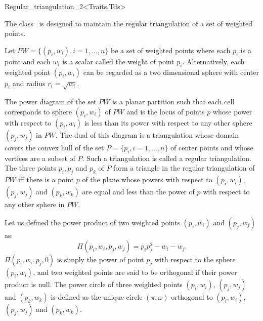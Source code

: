 

\begin{ccRefClass}{Regular_triangulation_2<Traits,Tds>}  %


\ccDefinition
  
The class \ccRefName\ 
is designed to maintain the
regular triangulation of a set of weighted points.


Let ${  PW} = \{(p_i, w_i), i = 1, \ldots , n \}$ be a set of 
weighted points where each $p_i$ is a point and each $w_i$
is a scalar called the weight of point $p_i$.
Alternatively, each weighted point $(p_i, w_i)$ can be regarded
as a two dimensional sphere with center $p_i$ and radius $r_i=\sqrt{w_i}$.

The power diagram of the set ${  PW}$ is a planar partition 
such that each cell corresponds to sphere $(p_i, w_i)$ of ${  PW}$
and is the locus of points  $p$ whose power with respect to $(p_i, w_i)$
is less than its power with respect to any other sphere $(p_j, w_j)$
in ${  PW}$. 
The dual of this diagram is a triangulation 
whose domain covers the convex hull of the set 
${  P}= \{ p_i, i = 1, \ldots , n \}$ of center points
and whose vertices are a subset of ${  P}$.
Such a triangulation is called a regular triangulation.
The  three points $p_i, p_j$ and $p_k$ of ${  P}$
form a triangle in the regular triangulation of ${  PW}$
iff there is a point $p$ of the plane whose
powers with respect to $(p_i, w_i)$, $(p_j, w_j)$
and $(p_k, w_k)$ are equal and less than the power of $p$
with respect to any other sphere in  ${  PW}$.

Let us defined the power product of two weighted points
$(p_i, w_i)$ and $(p_j, w_j)$ as:
\[\Pi(p_i, w_i,p_j, w_j) = p_ip_j ^2 - w_i  - w_j  .\]
$\Pi(p_i, w_i,p_j, 0)$ is simply the power of point $p_j$
with respect to the sphere $(p_i, w_i)$, and two weighted points 
are said to be orthogonal if their power product is null.
The power circle of three weighted points
 $(p_i, w_i)$, $(p_j, w_j)$
and $(p_k, w_k)$ is defined as the unique circle
$(\pi, \omega)$  orthogonal to
 $(p_i, w_i)$, $(p_j, w_j)$
and $(p_k, w_k)$.


\end{ccRefClass}
